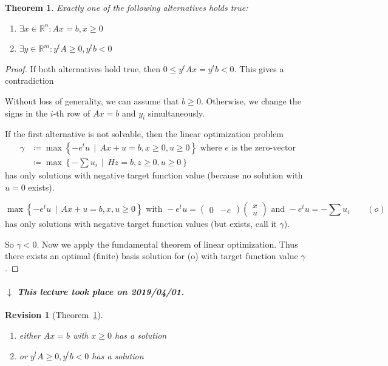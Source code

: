 \documentclass[a4paper]{article}
\newcounter{lecref}[subsection]
\numberwithin{lecref}{subsection}
\newtheorem{theorem}[lecref]{Theorem}
\newtheorem{revision}{Revision}
\newcommand{\SetDef}[2]{\left\{#1\,\mid\,#2\right\}}
\newcommand{\dateref}[1]{%
  \begin{mdframed}[backgroundcolor=gray!10,innerbottommargin=0pt,innertopmargin=0pt]
    \paragraph{\textit{$\downarrow$ This lecture took place on #1.}}%
  \end{mdframed}%
}
\begin{document}
\begin{theorem}
	\label{theorem:4.3}
	Exactly one of the following alternatives holds true:
	\begin{enumerate}
		\item $\exists x \in \mathbb R^n: Ax = b, x \geq 0$
		\item $\exists y \in \mathbb R^m: y^t A \geq 0, y^t b < 0$
	\end{enumerate}
\end{theorem}

\begin{proof}
	If both alternatives hold true, then $0 \leq y^tAx = y^tb < 0$. This gives a contradiction

	Without loss of generality, we can assume that $b \geq 0$. Otherwise, we change the signs in the $i$-th row of $Ax = b$ and $y_i$ simultaneously.

	If the first alternative is not solvable, then the linear optimization problem 
	\begin{align*}
		\gamma &\coloneqq \max\SetDef{-e^tu}{Ax + u = b, x \geq 0, u \geq 0} \text{ where $e$ is the zero-vector} \\
			   &\coloneqq \max\SetDef{-\sum u_i}{Hz = b, z \geq 0, u \geq 0}
	\end{align*}
	has only solutions with negative target function value (because no solution with $u = 0$ exists).

	\[ \max\SetDef{-e^t u}{Ax + u = b, x, u \geq 0} \text{ with } -e^t u = \begin{pmatrix} 0 & -e \end{pmatrix} \begin{pmatrix} x \\ u \end{pmatrix} \text{ and } -e^tu = -\sum u_i \qquad (o) \]
	has only solutions with negative target function values (but exists, call it $\gamma$).

	So $\gamma < 0$. Now we apply the fundamental theorem of linear optimization.
	Thus there exists an optimal (finite) basis solution for (o) with target function value $\gamma$.
\end{proof}

\dateref{2019/04/01}

\begin{revision}[Theorem~\ref{theorem:4.3}]
	\begin{enumerate}
		\item either $Ax = b$ with $x \geq 0$ has a solution
		\item or $y^t A \geq 0, y^tb <0$ has a solution
	\end{enumerate}
\end{revision}
\end{document}
